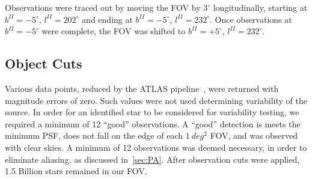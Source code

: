 \documentclass[aps,prb,twocolumn,superscriptaddress]{revtex4-1}
\begin{document}
Observations were traced out by moving the FOV by $3^{\circ}$ longitudinally, starting at $b^{II}=-5^{\circ}$, $l^{II}=202^{\circ}$ and ending at $b^{II}=-5^{\circ}$, $l^{II}=232^{\circ}$.  Once observations at $b^{II}=-5^{\circ}$ were complete, the FOV was shifted to $b^{II}=+5^{\circ}$, $l^{II}=232^{\circ}$.





\subsection{Object Cuts}\label{sec:cuts}

Various data points, reduced by the ATLAS pipeline~\cite{gri}, were returned with magnitude errors of zero.  Such 
values were not used determining variability of the source.  In order for an identified star to be considered for 
variability testing, we required a minimum of 12 ``good'' observations.  A ``good'' detection is meets the minimum 
PSF, does not fall on the edge of each $1~deg^{2}$ FOV, and was observed with clear skies.  A minimum of 12 
observations was deemed necessary, in order to eliminate aliasing, as discussed in~\cref{sec:PA}.  After observation 
cuts were applied, 1.5 Billion stars remained in our FOV.  
\end{document}

